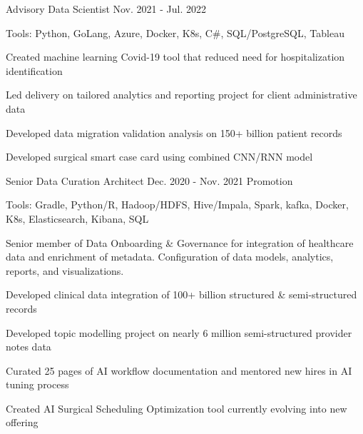 \begin{cventries}
  \cvexpsubposition
    {Advisory Data Scientist} %
    {Nov. 2021 - Jul. 2022} %
    {}
    {
      \begin{cvheavyparagraph}
        Tools: Python, GoLang, Azure, Docker, K8s, C\#, SQL/PostgreSQL, Tableau
      \end{cvheavyparagraph}
    }
    {
      \begin{cvitems}
        \item {Created machine learning Covid-19 tool that reduced need for hospitalization identification}
        \item {Led delivery on tailored analytics and reporting project for client administrative data}
        \item {Developed data migration validation analysis on 150+ billion patient records}
        \item {Developed surgical smart case card using combined CNN/RNN model}
      \end{cvitems}
    }

  \cvexpsubposition
    {Senior Data Curation Architect} %
    {Dec. 2020 - Nov. 2021} %
    {Promotion}
    {
      \begin{cvheavyparagraph}
        Tools: Gradle, Python/R, Hadoop/HDFS, Hive/Impala, Spark, kafka, Docker, K8s, Elasticsearch, Kibana, SQL
      \end{cvheavyparagraph}
    }
    {
      \begin{cvparagraph}
        Senior member of Data Onboarding \& Governance for integration of healthcare data and enrichment of metadata. Configuration of data models, analytics, reports, and visualizations.
      \end{cvparagraph}
      \begin{cvitems} %
        \item {Developed clinical data integration of 100+ billion structured \& semi-structured records}
        \item {Developed topic modelling project on nearly 6 million semi-structured provider notes data}
        \item {Curated 25 pages of AI workflow documentation and mentored new hires in AI tuning process}
        \item {Created AI Surgical Scheduling Optimization tool currently evolving into new offering}
      \end{cvitems}
    }


\end{cventries}
